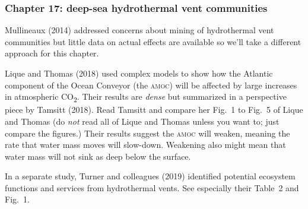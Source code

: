 \documentclass[12pt, addpoints]{exam}
\begin{document}
\begin{questions}
\subsubsection*{Chapter 17: deep-sea hydrothermal vent communities}

Mullineaux (2014) addressed concerns about mining of hydrothermal vent communities but little data on actual effects are available  so we'll take a different approach for this chapter. 

Lique and Thomas (2018) used complex models to show how the Atlantic component of the Ocean Conveyor (the \textsc{amoc}) will be affected by large increases in atmospheric CO\textsubscript{2}. Their results are \emph{dense} but summarized in a perspective piece by Tamsitt (2018).  Read Tamsitt and compare her Fig.~1 to Fig.~5 of Lique and Thomas (do \emph{not} read all of Lique and Thomas unless you want to; just compare the figures.) Their results suggest the \textsc{amoc} will weaken, meaning the rate that water mass moves will slow-down. Weakening also might mean that water mass will not sink as deep below the surface.

\question
In a separate study, Turner and colleagues (2019) identified potential ecosystem functions and services from hydrothermal vents. See especially their Table~2 and Fig.~1. 

\end{questions}
\end{document}
